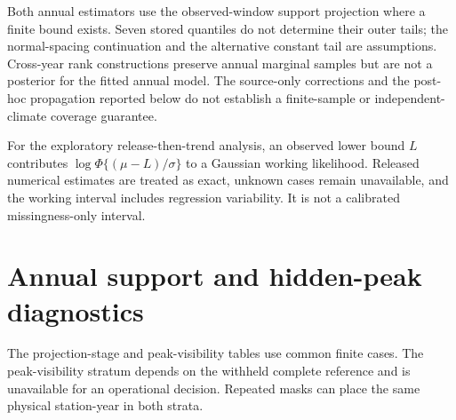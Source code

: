 \documentclass[draft]{agujournal2025}
\begin{document}
Both annual estimators use the observed-window support projection where a finite bound exists. Seven stored quantiles do not determine their outer tails; the normal-spacing continuation and the alternative constant tail are assumptions. Cross-year rank constructions preserve annual marginal samples but are not a posterior for the fitted annual model. The source-only corrections and the post-hoc propagation reported below do not establish a finite-sample or independent-climate coverage guarantee.

For the exploratory release-then-trend analysis, an observed lower bound $L$ contributes $\log\Phi\{(\mu-L)/\sigma\}$ to a Gaussian working likelihood. Released numerical estimates are treated as exact, unknown cases remain unavailable, and the working interval includes regression variability. It is not a calibrated missingness-only interval.


\clearpage















\clearpage
\section{Annual support and hidden-peak diagnostics}
The projection-stage and peak-visibility tables use common finite cases. The peak-visibility stratum depends on the withheld complete reference and is unavailable for an operational decision. Repeated masks can place the same physical station-year in both strata.



\clearpage


\clearpage


\clearpage



\clearpage






\clearpage

\end{document}
